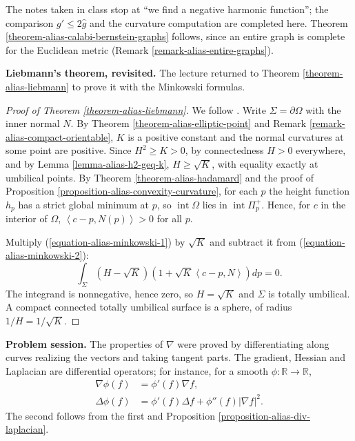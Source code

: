 The notes taken in class stop at
``we find a negative harmonic function'';
the comparison $g'\leq 2\hat{g}$ and the
curvature computation are completed here.
Theorem
\ref{theorem-alias-calabi-bernstein-graphs}
follows, since an entire graph is complete
for the Euclidean metric
(Remark \ref{remark-alias-entire-graphs}).

\medskip\noindent
{\bf Liebmann's theorem, revisited.}
The lecture returned to Theorem
\ref{theorem-alias-liebmann} to prove it
with the Minkowski formulas.

\begin{proof}[Proof of Theorem
\ref{theorem-alias-liebmann}]
We follow \cite[Theorem 3.4,
pp.~25--26]{alias2006analisis}. Write
$\Sigma=\partial\Omega$ with the inner
normal $N$. By Theorem
\ref{theorem-alias-elliptic-point} and
Remark
\ref{remark-alias-compact-orientable}, $K$
is a positive constant and the normal
curvatures at some point are positive.
Since $H^2\geq K>0$, by connectedness
$H>0$ everywhere, and by Lemma
\ref{lemma-alias-h2-geq-k},
$H\geq\sqrt{K}$, with equality exactly at
umbilical points. By Theorem
\ref{theorem-alias-hadamard} and the proof
of Proposition
\ref{proposition-alias-convexity-curvature},
for each $p$ the height function $h_p$
has a strict global minimum at $p$, so
$\operatorname{int}\Omega$ lies in
$\operatorname{int}\Pi_p^+$. Hence, for $c$
in the interior of $\Omega$,
$\left\langle{} c-p,N(p)
\right\rangle{}>0$ for all $p$.

Multiply (\ref{equation-alias-minkowski-1})
by $\sqrt{K}$ and subtract it from
(\ref{equation-alias-minkowski-2}):
$$
\int_\Sigma\left(H-\sqrt{K}\right)
\left(1+\sqrt{K}\left\langle{} c-p,N
\right\rangle{}\right)dp=0.
$$
The integrand is nonnegative, hence zero,
so $H=\sqrt{K}$ and $\Sigma$ is totally
umbilical. A compact connected totally
umbilical surface is a sphere, of radius
$1/H=1/\sqrt{K}$.
\end{proof}

\medskip\noindent
{\bf Problem session.}
The properties of $\nabla$ were proved by
differentiating along curves realizing the
vectors and taking tangent parts. The
gradient, Hessian and Laplacian are
differential operators; for instance, for
a smooth $\phi:\mathbb{R}\to\mathbb{R}$,
$$
\begin{aligned}
\nabla\phi(f)&=\phi'(f)\nabla f,\\
\Delta\phi(f)&=\phi'(f)\Delta f
+\phi''(f)|\nabla f|^2.
\end{aligned}
$$
The second follows from the first and
Proposition
\ref{proposition-alias-div-laplacian}.

